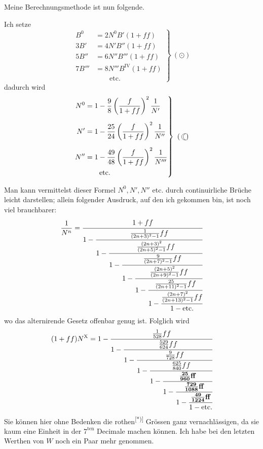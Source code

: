 \par\indent Meine Berechnungsmethode ist nun folgende.

\par\indent Ich setze
\newcommand{\BesselMoon}{\mathord{\vcenter{\hbox{\begin{tikzpicture}[x=1cm,y=1cm]\draw[line width=.35pt] (.12,.16) .. controls (-.16,.16) and (-.16,-.16) .. (.12,-.16) .. controls (-.05,-.12) and (-.05,.12) .. cycle;\end{tikzpicture}}}}}
\[
\left.\begin{aligned}
B^0&=2N^0B'(1+ff)\\
3B'&=4N'B''(1+ff)\\
5B''&=6N''B'''(1+ff)\\
7B'''&=8N'''B^{\mathrm{IV}}(1+ff)\\
&\qquad\text{etc.}
\end{aligned}\right\}\ (\odot)
\]
\noindent dadurch wird
\[
\left.\begin{aligned}
N^0&=1-\frac98\left(\frac f{1+ff}\right)^2\frac1{N'}\\[.6em]
N'&=1-\frac{25}{24}\left(\frac f{1+ff}\right)^2\frac1{N''}\\[.6em]
N''&=1-\frac{49}{48}\left(\frac f{1+ff}\right)^2\frac1{N'''}\\
&\qquad\text{etc.}
\end{aligned}\right\}\ (\BesselMoon)
\]
\par\indent Man kann vermittelst dieser Formel $N^0,N',N''$ etc. durch continuirliche Brüche leicht darstellen; allein folgender Ausdruck, auf den ich gekommen bin, ist noch viel brauchbarer:
\clearpage
{}
\[
\frac1{N^n}=\cfrac{1+ff}{1-\cfrac{\frac1{(2n+3)^2-1}ff}{1-\cfrac{\frac{(2n+3)^2}{(2n+5)^2-1}ff}{1-\cfrac{\frac9{(2n+7)^2-1}ff}{1-\cfrac{\frac{(2n+5)^2}{(2n+9)^2-1}ff}{1-\cfrac{\frac{25}{(2n+11)^2-1}ff}{1-\cfrac{\frac{(2n+7)^2}{(2n+13)^2-1}ff}{1-\text{etc.}}}}}}}}
\]
\noindent wo das alternirende Gesetz offenbar genug ist. Folglich wird
\[
(1+ff)N^{\mathrm X}=1-\cfrac{\frac1{528}ff}{1-\cfrac{\frac{529}{624}ff}{1-\cfrac{\frac9{728}ff}{1-\cfrac{\frac{625}{840}ff}{1-\cfrac{\frac{\mathbf{25}}{\mathbf{960}}\mathbf{ff}}{1-\cfrac{\frac{\mathbf{729}}{\mathbf{1088}}\mathbf{ff}}{1-\cfrac{\frac{\mathbf{49}}{\mathbf{1224}}\mathbf{ff}}{1-\text{etc.}}}}}}}}
\]
\noindent Sie können hier ohne Bedenken die rothen\textsuperscript{[*)]} Grössen ganz vernachlässigen, da sie kaum eine Einheit in der $7^{\mathrm{ten}}$ Decimale machen können. Ich habe bei den letzten Werthen von $W$ noch ein Paar mehr genommen.

